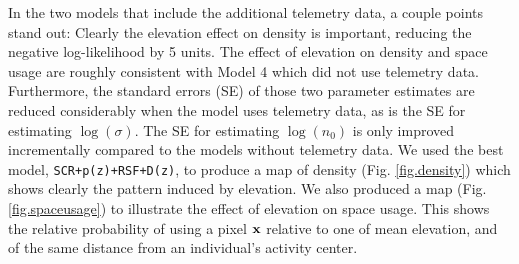 In the two models that include the additional telemetry data, a couple
points stand out: Clearly the elevation effect on density is
important, reducing the negative log-likelihood by 5 units. The effect
of elevation on density and space usage are roughly consistent with
Model 4 which did not use telemetry data. Furthermore, the standard
errors (SE) of those two parameter estimates are reduced considerably
when the model uses telemetry data, as is the SE for estimating
$\log(\sigma)$.  The SE for estimating $\log(n_{0})$ is only improved
incrementally compared to the models without telemetry data.  We used
the best model, \mbox{\tt SCR+p(z)+RSF+D(z)}, to produce a map of
density (Fig. \ref{fig.density}) which shows clearly the pattern
induced by elevation. We also produced a map
(Fig. \ref{fig.spaceusage}) to illustrate the effect of elevation on
space usage. This shows the relative probability of using a pixel
${\bf x}$ relative to one of mean elevation, and of the same distance
from an individual's activity center.


